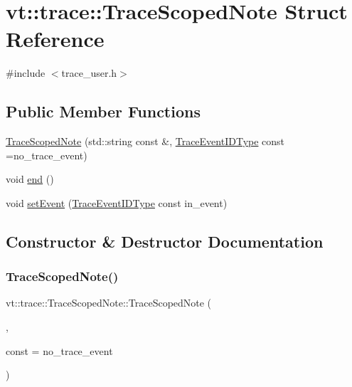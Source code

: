 \hypertarget{structvt_1_1trace_1_1_trace_scoped_note}{}\section{vt\+:\+:trace\+:\+:Trace\+Scoped\+Note Struct Reference}
\label{structvt_1_1trace_1_1_trace_scoped_note}


{\ttfamily \#include $<$trace\+\_\+user.\+h$>$}

\subsection*{Public Member Functions}
\begin{DoxyCompactItemize}
\item 
\hyperlink{structvt_1_1trace_1_1_trace_scoped_note_ab7dda5555f9118355f6cc77f7b3cdec8}{Trace\+Scoped\+Note} (std\+::string const \&, \hyperlink{namespacevt_1_1trace_a64a7185f3e102df8d8258f263ccd1582}{Trace\+Event\+I\+D\+Type} const =no\+\_\+trace\+\_\+event)
\item 
void \hyperlink{structvt_1_1trace_1_1_trace_scoped_note_abfffe38b863ed36f508a3aecef7c094b}{end} ()
\item 
void \hyperlink{structvt_1_1trace_1_1_trace_scoped_note_aebd0afbbbe580b82d5669c8a90a1bc01}{set\+Event} (\hyperlink{namespacevt_1_1trace_a64a7185f3e102df8d8258f263ccd1582}{Trace\+Event\+I\+D\+Type} const in\+\_\+event)
\end{DoxyCompactItemize}


\subsection{Constructor \& Destructor Documentation}
\mbox{\label{structvt_1_1trace_1_1_trace_scoped_note_ab7dda5555f9118355f6cc77f7b3cdec8}} 
\subsubsection{\texorpdfstring{Trace\+Scoped\+Note()}{TraceScopedNote()}}
{\footnotesize\ttfamily vt\+::trace\+::\+Trace\+Scoped\+Note\+::\+Trace\+Scoped\+Note (\begin{DoxyParamCaption}\item[{std\+::string const \&}]{,  }\item[{\hyperlink{namespacevt_1_1trace_a64a7185f3e102df8d8258f263ccd1582}{Trace\+Event\+I\+D\+Type}}]{const = {\ttfamily no\+\_\+trace\+\_\+event} }\end{DoxyParamCaption})\hspace{0.3cm}{\ttfamily [inline]}}



